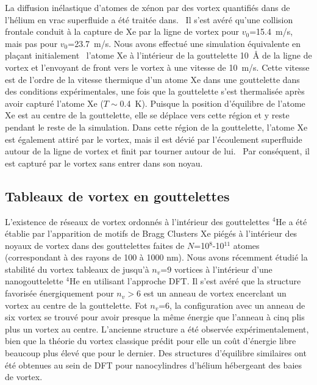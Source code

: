 La diffusion inélastique d'atomes de xénon par des vortex quantifiés dans de l'hélium en vrac superfluide a été traitée dans.
 Il s'est avéré qu'une collision frontale conduit à la capture de Xe par la ligne de vortex pour $v_0$=15.4~m/s, mais pas pour $v_0$=23.7~m/s.
Nous avons effectué une simulation équivalente en plaçant initialement
 l'atome Xe à l'intérieur de la gouttelette 10~\AA{} de la ligne de vortex et l'envoyant de front vers le vortex à une vitesse de 10~m/s.
Cette vitesse est de l'ordre de la vitesse thermique d'un atome Xe dans une gouttelette dans des conditions expérimentales,
une fois que la gouttelette s'est thermalisée après avoir capturé l'atome Xe ($T\!\!\sim$0.4~K)\citep{Toe04}.
Puisque la position d'équilibre de l'atome Xe est au centre de la gouttelette, elle se déplace vers cette région et y reste pendant le reste de la simulation.
Dans cette région de la gouttelette, l'atome Xe est également attiré par le vortex, mais il est dévié par l'écoulement superfluide autour de la ligne de vortex et finit par tourner autour de lui.
 Par conséquent, il est capturé par le vortex sans entrer dans son noyau.
 
 	\subsection*{Tableaux de vortex en gouttelettes}
L'existence de réseaux de vortex ordonnés à l'intérieur des gouttelettes $^4$He a été établie par l'apparition de motifs de Bragg
Clusters Xe piégés à l'intérieur des noyaux de vortex dans des gouttelettes faites de $N$=10$^8$-10$^{11}$ atomes
(correspondant à des rayons de 100 à 1000 nm)\citep{Gom14,Jones2016}. Nous avons récemment étudié la stabilité du vortex
tableaux de jusqu'à $n_v$=9 vortices
à l'intérieur d'une nanogouttelette $^4$He en utilisant l'approche DFT\citep{Anc15}.
Il s'est avéré que
la structure favorisée énergiquement pour $n_v\!\!>$6 est un anneau
de vortex encerclant un vortex au centre de la gouttelette.
Fot $n_v$=6, la configuration avec un anneau de six vortex se trouvé pour avoir presque
la même énergie que l'anneau à cinq plis
plus un vortex au centre. L'ancienne structure
a été observée expérimentalement\citep{Gom14,Jones2016,Ber17},
bien que la théorie du vortex classique
prédit pour elle un coût d'énergie libre beaucoup plus élevé que pour le dernier\citep{Cam79}.
Des structures d'équilibre similaires ont été obtenues au sein de DFT pour
nanocylindres d'hélium hébergeant des baies de vortex\citep{Anc14}.

